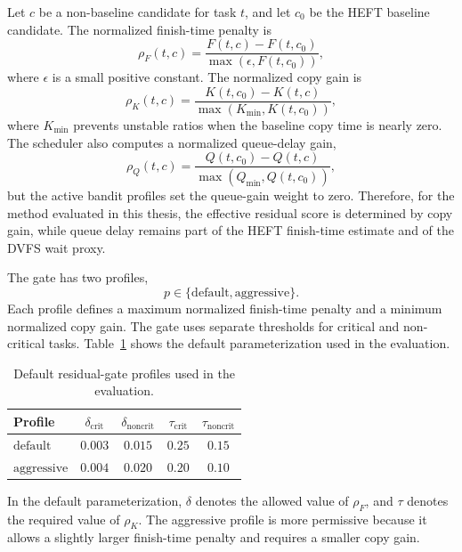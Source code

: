 Let $c$ be a non-baseline candidate for task $t$, and let $c_0$ be the HEFT baseline candidate. The normalized finish-time penalty is
\begin{equation}
\rho_F(t,c)
=
\frac{F(t,c)-F(t,c_0)}{\max(\epsilon,F(t,c_0))},
\label{eq:end-penalty}
\end{equation}
where $\epsilon$ is a small positive constant. The normalized copy gain is
\begin{equation}
\rho_K(t,c)
=
\frac{K(t,c_0)-K(t,c)}{\max(K_{\min},K(t,c_0))},
\label{eq:copy-gain}
\end{equation}
where $K_{\min}$ prevents unstable ratios when the baseline copy time is nearly zero. The scheduler also computes a normalized queue-delay gain,
\begin{equation}
\rho_Q(t,c)
=
\frac{Q(t,c_0)-Q(t,c)}{\max(Q_{\min},Q(t,c_0))},
\end{equation}
but the active bandit profiles set the queue-gain weight to zero. Therefore, for the method evaluated in this thesis, the effective residual score is determined by copy gain, while queue delay remains part of the HEFT finish-time estimate and of the DVFS wait proxy.

The gate has two profiles,
\begin{equation}
p\in\{\mathrm{default},\mathrm{aggressive}\}.
\end{equation}
Each profile defines a maximum normalized finish-time penalty and a minimum normalized copy gain. The gate uses separate thresholds for critical and non-critical tasks. Table~\ref{tab:gate-profiles} shows the default parameterization used in the evaluation.
\begin{table}[t]
\centering
\footnotesize
\begin{tabular}{@{}lcccc@{}}
\toprule
Profile & $\delta_{\mathrm{crit}}$ & $\delta_{\mathrm{noncrit}}$ & $\tau_{\mathrm{crit}}$ & $\tau_{\mathrm{noncrit}}$ \\
\midrule
$\mathrm{default}$ & $0.003$ & $0.015$ & $0.25$ & $0.15$ \\
$\mathrm{aggressive}$ & $0.004$ & $0.020$ & $0.20$ & $0.10$ \\
\bottomrule
\end{tabular}
\caption{Default residual-gate profiles used in the evaluation.}
\label{tab:gate-profiles}
\end{table}
In the default parameterization, $\delta$ denotes the allowed value of $\rho_F$, and $\tau$ denotes the required value of $\rho_K$. The aggressive profile is more permissive because it allows a slightly larger finish-time penalty and requires a smaller copy gain.

